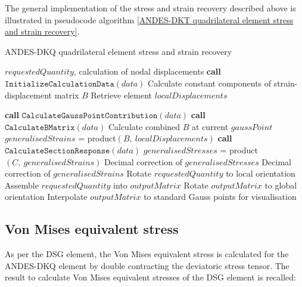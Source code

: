 The general implementation of the stress and strain recovery described above is illustrated in pseudocode algorithm \ref{ANDES-DKT quadrilateral element stress and strain recovery}.
\newpage
\begin{algorithm}[tbh]
	\onehalfspacing
	\caption{ANDES-DKQ quadrilateral element stress and strain recovery}
	\label{ANDES-DKT quadrilateral element stress and strain recovery}
	\begin{algorithmic}[1]
		\Require $requestedQuantity$, calculation of nodal displacements
		\State \textbf{call} $\texttt{InitializeCalculationData}(data)$
		\State \hspace{\algorithmicindent}Calculate constant components of strain-displacement matrix $B$
		\State \hspace{\algorithmicindent}Retrieve element $localDisplacements$
		
		\State \textbf{call} $\texttt{CalculateGaussPointContribution}(data)$
		\State \hspace{\algorithmicindent}\textbf{call} $\texttt{CalculateBMatrix}(data)$
		\State \hspace{\algorithmicindent}\hspace{\algorithmicindent} Calculate combined $B$ at current $gaussPoint$
		\State $generalisedStrains$ = product$(B,\ localDisplacements)$
		\State \textbf{call} $\texttt{CalculateSectionResponse}(data)$
		\State $generalisedStresses$ = product $(C,\ generalisedStrains)$
		\State Decimal correction of $generalisedStresses$
		\EndIf
		\State Decimal correction of $generalisedStrains$ 
		\State Rotate $requestedQuantity$ to local orientation
		\EndIf
		\State Assemble $requestedQuantity$ into $outputMatrix$
		\State Rotate $outputMatrix$ to global orientation
		\EndIf
		\State Interpolate $outputMatrix$ to standard Gauss points for visualisation
		\EndWhile
	\end{algorithmic}
\end{algorithm}

\subsection{Von Mises equivalent stress}

As per the DSG element, the Von Mises equivalent stress is calculated for the ANDES-DKQ element by double contracting the deviatoric stress tensor. The result to calculate Von Mises equivalent stresses of the DSG element is recalled:

